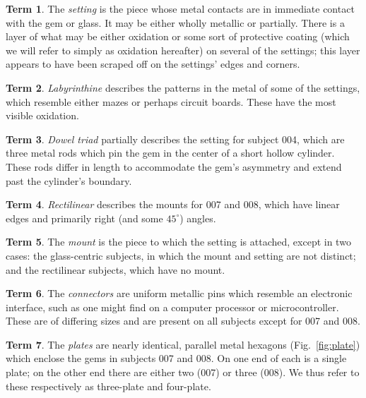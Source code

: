 \documentclass[10pt]{article}
\theoremstyle{definition}
\newtheorem{term}{Term}
\begin{document}
\begin{term}
The \emph{setting} is the piece whose metal contacts are in immediate contact with the gem or glass. It may be either wholly metallic or partially. There is a layer of what may be either oxidation or some sort of protective coating (which we will refer to simply as oxidation hereafter) on several of the settings; this layer appears to have been scraped off on the settings' edges and corners.
\end{term}
\begin{term}
\emph{Labyrinthine} describes the patterns in the metal of some of the settings, which resemble either mazes or perhaps circuit boards. These have the most visible oxidation.
\end{term}
\begin{term}
\emph{Dowel triad} partially describes the setting for subject 004, which are three metal rods which pin the gem in the center of a short hollow cylinder. These rods differ in length to accommodate the gem's asymmetry and extend past the cylinder's boundary. 
\end{term}
\begin{term}
\emph{Rectilinear} describes the mounts for 007 and 008, which have linear edges and primarily right (and some $45^\circ$) angles.
\end{term}
\begin{term}
The \emph{mount} is the piece to which the setting is attached, except in two cases: the glass-centric subjects, in which the mount and setting are not distinct; and the rectilinear subjects, which have no mount.
\end{term}
\begin{term}
The \emph{connectors} are uniform metallic pins which resemble an electronic interface, such as one might find on a computer processor or microcontroller. These are of differing sizes and are present on all subjects except for 007 and 008.
\end{term}
\begin{term}
The \emph{plates} are nearly identical, parallel metal hexagons (Fig.~\ref{fig:plate}) which enclose the gems in subjects 007 and 008. On one end of each is a single plate; on the other end there are either two (007) or three (008). We thus refer to these respectively as three-plate and four-plate.
\end{term}
\end{document}
